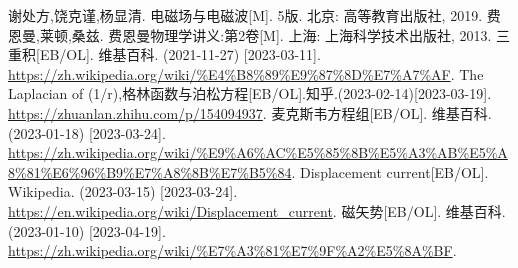 \begin{thebibliography}{99}%
     谢处方,饶克谨,杨显清. 电磁场与电磁波[M]. 5版. 北京: 高等教育出版社, 2019.
     费恩曼,莱顿,桑兹. 费恩曼物理学讲义:第2卷[M]. 上海: 上海科学技术出版社, 2013.
     三重积[EB/OL]. 维基百科. (2021-11-27) [2023-03-11]. \\\url{https://zh.wikipedia.org/wiki/%E4%B8%89%E9%87%8D%E7%A7%AF}.
     The Laplacian of (1/r),格林函数与泊松方程[EB/OL].知乎.(2023-02-14)[2023-03-19].\\\url{https://zhuanlan.zhihu.com/p/154094937}.
     麦克斯韦方程组[EB/OL]. 维基百科. (2023-01-18) [2023-03-24]. \\\url{https://zh.wikipedia.org/wiki/%E9%A6%AC%E5%85%8B%E5%A3%AB%E5%A8%81%E6%96%B9%E7%A8%8B%E7%B5%84}.
     Displacement current[EB/OL]. Wikipedia. (2023-03-15) [2023-03-24]. \\\url{https://en.wikipedia.org/wiki/Displacement_current}.
     磁矢势[EB/OL]. 维基百科. (2023-01-10) [2023-04-19]. \\\url{https://zh.wikipedia.org/wiki/%E7%A3%81%E7%9F%A2%E5%8A%BF}.
\end{thebibliography}
